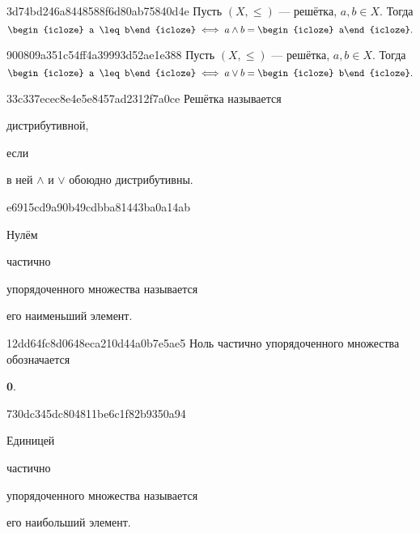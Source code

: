 \begin{note}{3d74bd246a8448588f6d80ab75840d4e}
    Пусть \({ (X, \leqslant) }\) --- решётка,\: \({ a, b \in X }\).
    Тогда
    \[
        \begin{icloze}{2}a \leq b\end{icloze} \iff a \land b = \begin{icloze}{1}a\end{icloze}.
    \]
\end{note}

\begin{note}{900809a351c54ff4a39993d52ae1e388}
    Пусть \({ (X, \leqslant) }\) --- решётка,\: \({ a, b \in X }\).
    Тогда
    \[
        \begin{icloze}{2}a \leq b\end{icloze} \iff a \lor b = \begin{icloze}{1}b\end{icloze}.
    \]
\end{note}

\begin{note}{33c337ecec8e4e5e8457ad2312f7a0ce}
    Решётка называется \begin{icloze}{2}дистрибутивной,\end{icloze} если \begin{icloze}{1}в ней \({ \land }\) и \({ \lor }\) обоюдно дистрибутивны.\end{icloze}
\end{note}

\begin{note}{e6915cd9a90b49cdbba81443ba0a14ab}
    \begin{icloze}{2}Нулём\end{icloze} \begin{icloze}{3}частично\end{icloze} упорядоченного множества называется \begin{icloze}{1}его наименьший элемент.\end{icloze}
\end{note}

\begin{note}{12dd64fc8d0648eca210d44a0b7e5ae5}
    Ноль частично упорядоченного множества обозначается \begin{icloze}{1}\({ \mathbf{0} }\).\end{icloze}
\end{note}

\begin{note}{730dc345dc804811be6c1f82b9350a94}
    \begin{icloze}{2}Единицей\end{icloze} \begin{icloze}{3}частично\end{icloze} упорядоченного множества называется \begin{icloze}{1}его наибольший элемент.\end{icloze}
\end{note}

